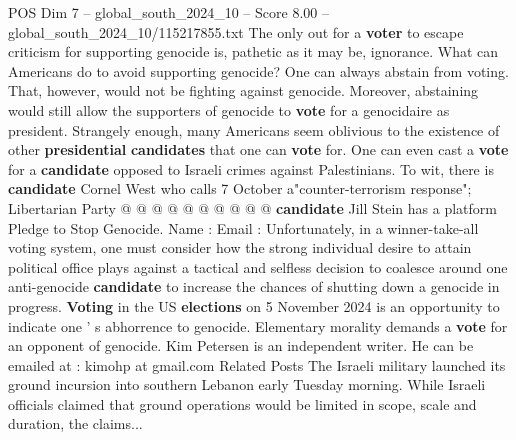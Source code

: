 \begin{textsample}{POS Dim 7 – global\_south\_2024\_10 – Score 8.00 – global\_south\_2024\_10/115217855.txt}
The only out for a \textbf{voter} to escape criticism for supporting genocide is, pathetic as it may be, ignorance.
What can Americans do to avoid supporting genocide?
One can always abstain from voting.
That, however, would not be fighting against genocide.
Moreover, abstaining would still allow the supporters of genocide to \textbf{vote} for a genocidaire as president.
Strangely enough, many Americans seem oblivious to the existence of other \textbf{presidential} \textbf{candidates} that one can \textbf{vote} for.
One can even cast a \textbf{vote} for a \textbf{candidate} opposed to Israeli crimes against Palestinians.
To wit, there is \textbf{candidate} Cornel West who calls 7 October a"counter-terrorism response"; Libertarian Party @ @ @ @ @ @ @ @ @ @ \textbf{candidate} Jill Stein has a platform Pledge to Stop Genocide.
Name : Email : Unfortunately, in a winner-take-all voting system, one must consider how the strong individual desire to attain political office plays against a tactical and selfless decision to coalesce around one anti-genocide \textbf{candidate} to increase the chances of shutting down a genocide in progress. \textbf{Voting} in the US \textbf{elections} on 5 November 2024 is an opportunity to indicate one ' s abhorrence to genocide.
Elementary morality demands a \textbf{vote} for an opponent of genocide.
Kim Petersen is an independent writer.
He can be emailed at : kimohp at gmail.com Related Posts The Israeli military launched its ground incursion into southern Lebanon early Tuesday morning.
While Israeli officials claimed that ground operations would be limited in scope, scale and duration, the claims...

\end{textsample}

